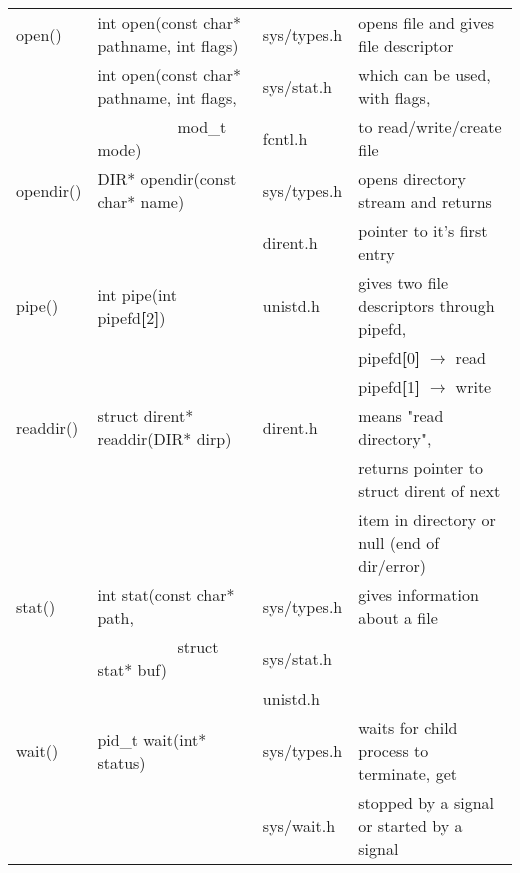 \documentclass{article}
\begin{document}
\begin{tabular}{llll}
    \\ \hline
    open() & int open(const char* pathname, int flags) & sys/types.h & opens file and gives file descriptor
    \\
    & int open(const char* pathname, int flags, & sys/stat.h & which can be used, with flags,
    \\
    & \ \ \ \ \ \ \ \ \ \ mod\_t mode) & fcntl.h & to read/write/create file
    \\ \hline
    opendir() & DIR* opendir(const char* name) & sys/types.h & opens directory stream and returns
    \\
    & & dirent.h & pointer to it's first entry
    \\ \hline
    pipe() & int pipe(int pipefd\textbf{[}2\textbf{]}) & unistd.h & gives two file descriptors through pipefd,
    \\
    & & & pipefd\textbf{[}0\textbf{]} $\rightarrow$ read
    \\
    & & & pipefd\textbf{[}1\textbf{]} $\rightarrow$ write
    \\ \hline
    readdir() & struct dirent* readdir(DIR* dirp) & dirent.h & means "read directory",
    \\
    & & & returns pointer to struct dirent of next 
    \\
    & & & item in directory or null (end of dir/error)
    \\ \hline
    stat() & int stat(const char* path, & sys/types.h & gives information about a file
    \\
    & \ \ \ \ \ \ \ \ \ \ struct stat* buf) & sys/stat.h
    \\
    & & unistd.h
    \\ \hline
    wait() & pid\_t wait(int* status) & sys/types.h & waits for child process to terminate, get 
    \\
    & & sys/wait.h & stopped by a signal or started by a signal
\end{tabular}
\end{document}
